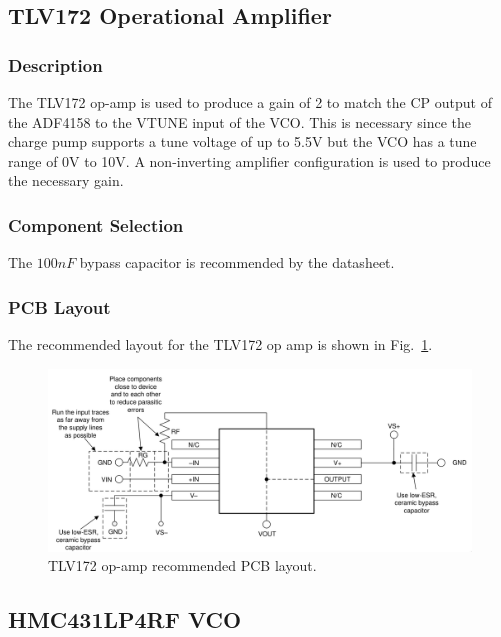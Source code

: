 \subsection{TLV172 Operational Amplifier}
\label{sec:tlv172-op-amp}

\subsubsection{Description}
\label{sec:tlv172-description}

The TLV172 op-amp is used to produce a gain of 2 to match the CP output of the ADF4158 to the VTUNE
input of the VCO\@. This is necessary since the charge pump supports a tune voltage of up to 5.5V
but the VCO has a tune range of 0V to 10V. A non-inverting amplifier configuration is used to
produce the necessary gain.

\subsubsection{Component Selection}
\label{sec:tlv172-component-selection}

The $100 \si{nF}$ bypass capacitor is recommended by the datasheet.

\subsubsection{PCB Layout}
\label{sec:tlv172-pcb}

The recommended layout for the TLV172 op amp is shown in Fig.~\ref{fig:tlv172-pcb}.

\begin{figure}[h]
        \centering
        \includegraphics[width=\textwidth]{data/tlv172-pcb}
        \caption{TLV172 op-amp recommended PCB layout.}
        \label{fig:tlv172-pcb}
\end{figure}

\subsection{HMC431LP4RF VCO}
\label{sec:hmc431lp4rf}

